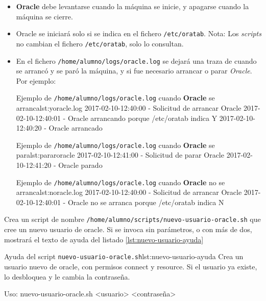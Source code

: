\begin{homeworkProblem}

  \begin{itemize}
  \item \textbf{Oracle} debe levantarse cuando la máquina se inicie, y apagarse cuando la máquina se cierre.
  \item Oracle se iniciará solo si se indica en el fichero \texttt{/etc/oratab}. {\scriptsize Nota: Los \textit{scripts} no cambian el fichero \texttt{/etc/oratab}, solo lo consultan.}
  
  \item En el fichero \texttt{/home/alumno/logs/oracle.log} se dejará una traza de cuando se arrancó y se paró la máquina, y si fue necesario arrancar o parar \textit{Oracle}. Por ejemplo:
    
    \begin{listadotxt}{Ejemplo de \texttt{/home/alumno/logs/oracle.log} cuando \textbf{Oracle} se arranca}{lst:yoracle.log}
      2017-02-10-12:40:00 - Solicitud de arrancar Oracle
      2017-02-10-12:40:01 - Oracle arrancando porque /etc/oratab indica Y
      2017-02-10-12:40:20 - Oracle arrancado
    \end{listadotxt}

    \begin{listadotxt}{Ejemplo de \texttt{/home/alumno/logs/oracle.log} cuando \textbf{Oracle} se para}{lst:pararoracle}
      2017-02-10-12:41:00 - Solicitud de parar Oracle
      2017-02-10-12:41:20 - Oracle parado
    \end{listadotxt}

    \begin{listadotxt}{Ejemplo de \texttt{/home/alumno/logs/oracle.log} cuando \textbf{Oracle} no se arranca}{lst:noracle.log}
      2017-02-10-12:40:00 - Solicitud de arrancar Oracle
      2017-02-10-12:40:01 - Oracle no se arranca porque /etc/oratab indica N
    \end{listadotxt}

    
  \end{itemize}
  
\end{homeworkProblem}

\begin{homeworkProblem}
  Crea un script de nombre \texttt{/home/alumno/scripts/nuevo-usuario-oracle.sh} que cree un nuevo usuario de oracle. Si se invoca sin parámetros, o con más de dos, mostrará el texto de ayuda del listado \ref{lst:nuevo-usuario-ayuda}

  \begin{listadotxt}{Ayuda del script \texttt{nuevo-usuario-oracle.sh}}{lst:nuevo-usuario-ayuda}
  Crea un usuario nuevo de oracle, con permisos connect y resource.
  Si el usuario ya existe, lo desbloquea y le cambia la contraseña.
  
  Uso: nuevo-usuario-oracle.sh <usuario> <contraseña>
  \end{listadotxt}
\end{homeworkProblem}


